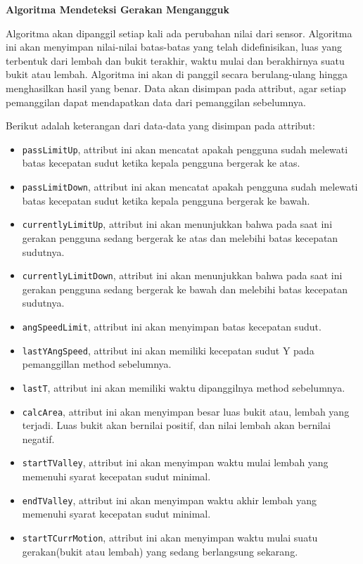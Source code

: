 \documentclass[a4paper,twoside]{article}
\begin{document}
\begin{enumerate}
\textbf{Algoritma Mendeteksi Gerakan Mengangguk}
\label{ssec:algoritma_mendeteksi_gerakan_mengangguk}

Algoritma akan dipanggil setiap kali ada perubahan nilai dari sensor. Algoritma ini akan menyimpan nilai-nilai batas-batas yang telah didefinisikan, luas yang terbentuk dari lembah dan bukit terakhir, waktu mulai dan berakhirnya suatu bukit atau lembah. Algoritma ini akan di panggil secara berulang-ulang hingga menghasilkan hasil yang benar. Data akan disimpan pada attribut, agar setiap pemanggilan dapat mendapatkan data dari pemanggilan sebelumnya. 

Berikut adalah keterangan dari data-data yang disimpan pada attribut:
\begin{itemize}
	\item \texttt{passLimitUp}, attribut ini akan mencatat apakah pengguna sudah melewati batas kecepatan sudut ketika kepala pengguna bergerak ke atas.
	\item \texttt{passLimitDown}, attribut ini akan mencatat apakah pengguna sudah melewati batas kecepatan sudut ketika kepala pengguna bergerak ke bawah.
	\item \texttt{currentlyLimitUp}, attribut ini akan menunjukkan bahwa pada saat ini gerakan pengguna sedang bergerak ke atas dan melebihi batas kecepatan sudutnya.
	\item \texttt{currentlyLimitDown}, attribut ini akan menunjukkan bahwa pada saat ini gerakan pengguna sedang bergerak ke bawah dan melebihi batas kecepatan sudutnya.
	\item \texttt{angSpeedLimit}, attribut ini akan menyimpan batas kecepatan sudut.
	\item \texttt{lastYAngSpeed}, attribut ini akan memiliki kecepatan sudut Y pada pemanggillan method sebelumnya. 
	\item \texttt{lastT}, attribut ini akan memiliki waktu dipanggilnya method sebelumnya. 
	\item \texttt{calcArea}, attribut ini akan menyimpan besar luas bukit atau, lembah yang terjadi. Luas bukit akan bernilai positif, dan nilai lembah akan bernilai negatif. 
	\item \texttt{startTValley}, attribut ini akan menyimpan waktu mulai lembah yang memenuhi syarat kecepatan sudut minimal. 
	\item \texttt{endTValley}, attribut ini akan menyimpan waktu akhir lembah yang memenuhi syarat kecepatan sudut minimal.
	\item \texttt{startTCurrMotion}, attribut ini akan menyimpan waktu mulai suatu gerakan(bukit atau lembah) yang sedang berlangsung sekarang.

\end{itemize}
\end{enumerate}
\end{document}
